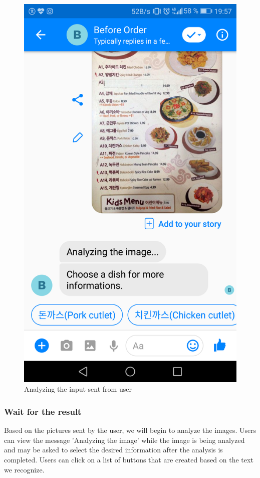 \begin{figure}[htbp]
\centerline{\includegraphics[height=\custompicheight]{./pictures/Screenshot_20181125-195722}}
\caption{Analyzing the input sent from user}
\label{fig:Before Order_analyze_input}
\end{figure}
\FloatBarrier
\subsubsection{Wait for the result}
 Based on the pictures sent by the user, we will begin to analyze the images. Users can view the message 'Analyzing the image' while the image is being analyzed and may be asked to select the desired information after the analysis is completed. Users can click on a list of buttons that are created based on the text we recognize.


